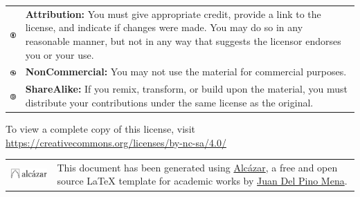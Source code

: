     \noindent
    \begin{tabular}{m{1.5cm} m{13.5cm}}
        \includegraphics[width=2em]{opening/resources/license/by.pdf} & \textbf{Attribution:} You must give appropriate credit, provide a link to the license, and indicate if changes were made. You may do so in any reasonable manner, but not in any way that suggests the licensor endorses you or your use.\\
        \includegraphics[width=2em]{opening/resources/license/nc.pdf} & \textbf{NonCommercial:} You may not use the material for commercial purposes.\\
        \includegraphics[width=2em]{opening/resources/license/sa.pdf} & \textbf{ShareAlike:} If you remix, transform, or build upon the material, you must distribute your contributions under the same license as the original.
    \end{tabular}
    
    \noindent To view a complete copy of this license, visit 
    \href{https://creativecommons.org/licenses/by-nc-sa/4.0/}{https://creativecommons.org/licenses/by-nc-sa/4.0/}

\endgroup



\vspace*{5mm}




\begingroup

    \setlength\tabcolsep{0pt}
    \renewcommand*{\arraystretch}{1.4}
    \renewcommand{\baselinestretch}{1}\footnotesize  %
    
    \noindent
    \begin{tabular}{m{3.5cm} m{11.5cm}}
        \includegraphics[width=3cm]{opening/resources/logos/alcazar.pdf} & \noindent This document has been generated using {\href{https://github.com/dpmj/alcazar}{Alcázar}}, a free and open source {\LaTeX} template for academic works by \href{https://www.linkedin.com/in/dpmj/}{Juan Del Pino Mena}. \\
    \end{tabular}

    

\endgroup


